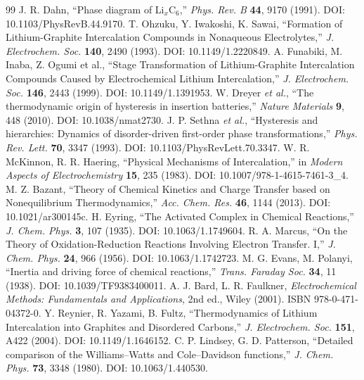 \documentclass[11pt,a4paper]{article}
\begin{document}
\begin{thebibliography}{99}
 J. R. Dahn, ``Phase diagram of Li$_x$C$_6$,'' \emph{Phys. Rev. B} \textbf{44}, 9170 (1991). DOI: 10.1103/PhysRevB.44.9170.
 T. Ohzuku, Y. Iwakoshi, K. Sawai, ``Formation of Lithium-Graphite Intercalation Compounds in Nonaqueous Electrolytes,'' \emph{J. Electrochem. Soc.} \textbf{140}, 2490 (1993). DOI: 10.1149/1.2220849.
 A. Funabiki, M. Inaba, Z. Ogumi et al., ``Stage Transformation of Lithium-Graphite Intercalation Compounds Caused by Electrochemical Lithium Intercalation,'' \emph{J. Electrochem. Soc.} \textbf{146}, 2443 (1999). DOI: 10.1149/1.1391953.
 W. Dreyer \emph{et al.}, ``The thermodynamic origin of hysteresis in insertion batteries,'' \emph{Nature Materials} \textbf{9}, 448 (2010). DOI: 10.1038/nmat2730.
 J. P. Sethna \emph{et al.}, ``Hysteresis and hierarchies: Dynamics of disorder-driven first-order phase transformations,'' \emph{Phys. Rev. Lett.} \textbf{70}, 3347 (1993). DOI: 10.1103/PhysRevLett.70.3347.
 W. R. McKinnon, R. R. Haering, ``Physical Mechanisms of Intercalation,'' in \emph{Modern Aspects of Electrochemistry} \textbf{15}, 235 (1983). DOI: 10.1007/978-1-4615-7461-3\_4.
 M. Z. Bazant, ``Theory of Chemical Kinetics and Charge Transfer based on Nonequilibrium Thermodynamics,'' \emph{Acc. Chem. Res.} \textbf{46}, 1144 (2013). DOI: 10.1021/ar300145c.
 H. Eyring, ``The Activated Complex in Chemical Reactions,'' \emph{J. Chem. Phys.} \textbf{3}, 107 (1935). DOI: 10.1063/1.1749604.
 R. A. Marcus, ``On the Theory of Oxidation-Reduction Reactions Involving Electron Transfer. I,'' \emph{J. Chem. Phys.} \textbf{24}, 966 (1956). DOI: 10.1063/1.1742723.
 M. G. Evans, M. Polanyi, ``Inertia and driving force of chemical reactions,'' \emph{Trans. Faraday Soc.} \textbf{34}, 11 (1938). DOI: 10.1039/TF9383400011.
 A. J. Bard, L. R. Faulkner, \emph{Electrochemical Methods: Fundamentals and Applications}, 2nd ed., Wiley (2001). ISBN 978-0-471-04372-0.
 Y. Reynier, R. Yazami, B. Fultz, ``Thermodynamics of Lithium Intercalation into Graphites and Disordered Carbons,'' \emph{J. Electrochem. Soc.} \textbf{151}, A422 (2004). DOI: 10.1149/1.1646152.
 C. P. Lindsey, G. D. Patterson, ``Detailed comparison of the Williams--Watts and Cole--Davidson functions,'' \emph{J. Chem. Phys.} \textbf{73}, 3348 (1980). DOI: 10.1063/1.440530.

\end{thebibliography}
\end{document}
